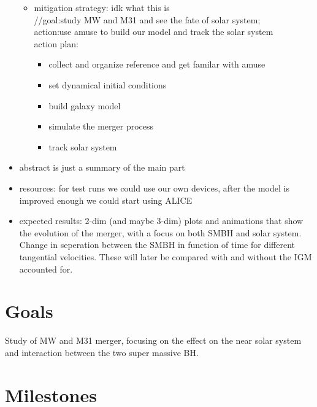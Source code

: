\documentclass[11pt, english]{article}
\begin{document}
\begin{itemize}
\begin{itemize}
        \item mitigation strategy: idk what this is\\
        //goal:study MW and M31 and see the fate of solar system;\\
        action:use amuse to build our model and track the solar system\\
        action plan: 
        \begin{itemize}
            \item collect and organize reference and get familar with amuse
            \item set dynamical initial conditions
            \item build galaxy model
            \item simulate the merger process
            \item track solar system
            \end{itemize}
        
        
    \end{itemize}
    \item abstract is just a summary of the main part
    \item resources: for test runs we could use our own devices, after the model is improved enough we could start using ALICE
    \item expected results: 2-dim (and maybe 3-dim) plots and animations that show the evolution of the merger, with a focus on both SMBH and solar system. Change in seperation between the SMBH in function of time for different tangential velocities. These will later be compared with and without the IGM accounted for.
\end{itemize}


\section{Goals}
Study of MW and M31 merger, focusing on the effect on the near solar system and interaction between the two super massive BH.

\section{Milestones}
\end{document}
